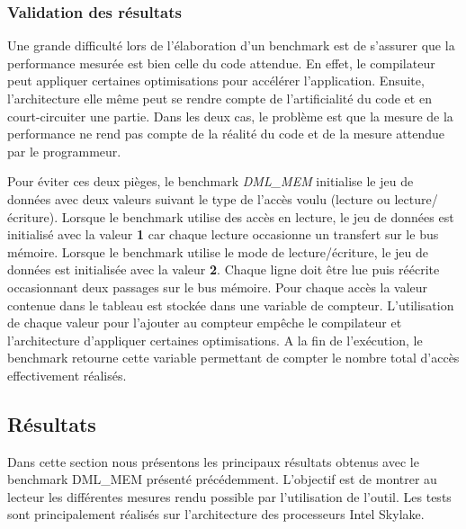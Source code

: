     
    \subsubsection{Validation des résultats}

    Une grande difficulté lors de l'élaboration d'un benchmark est de s'assurer que la performance mesurée est bien celle du code attendue. En effet, le compilateur peut appliquer certaines optimisations pour accélérer l'application. Ensuite, l'architecture elle même peut se rendre compte de l'artificialité du code et en court-circuiter une partie. Dans les deux cas, le problème est que la mesure de la performance ne rend pas compte de la réalité du code et de la mesure attendue par le programmeur. 
    
    Pour éviter ces deux pièges, le benchmark \textit{DML\_MEM} initialise le jeu de données avec deux valeurs suivant le type de l'accès voulu (lecture ou lecture/écriture). Lorsque le benchmark utilise des accès en lecture, le jeu de données est initialisé avec la valeur \textbf{1} car chaque lecture occasionne un transfert sur le bus mémoire. 
    Lorsque le benchmark utilise le mode de lecture/écriture, le jeu de données est initialisée avec la valeur \textbf{2}. Chaque ligne doit être lue puis réécrite occasionnant deux passages sur le bus mémoire. Pour chaque accès la valeur contenue dans le tableau est stockée dans une variable de compteur.  L'utilisation de chaque valeur pour l'ajouter au compteur empêche le compilateur et l'architecture d'appliquer certaines optimisations. A la fin de l'exécution, le benchmark retourne cette variable permettant de compter le nombre total d'accès effectivement réalisés.
    

    
    
    
    
    
    
    
    
\subsection{Résultats}

    Dans cette section nous présentons les principaux résultats obtenus avec le benchmark DML\_MEM présenté précédemment. L'objectif est de montrer au lecteur les différentes mesures rendu possible par l'utilisation de l'outil. Les tests sont principalement réalisés sur l'architecture des processeurs Intel Skylake. 


